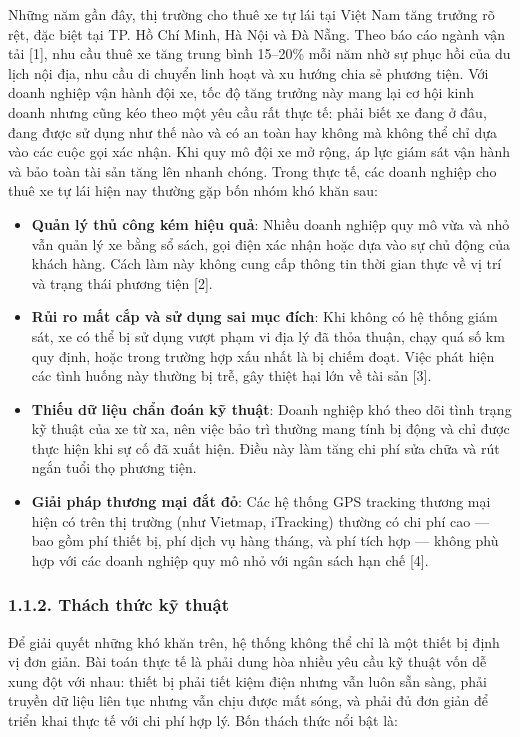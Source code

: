 \documentclass[a4paper]{extarticle}
\providecommand{\tightlist}{%
  \setlength{\itemsep}{0pt}\setlength{\parskip}{0pt}}
\begin{document}
Những năm gần đây, thị trường cho thuê xe tự lái tại Việt Nam tăng
trưởng rõ rệt, đặc biệt tại TP. Hồ Chí Minh, Hà Nội và Đà Nẵng. Theo báo
cáo ngành vận tải {[}1{]}, nhu cầu thuê xe tăng trung bình 15--20\% mỗi
năm nhờ sự phục hồi của du lịch nội địa, nhu cầu di chuyển linh hoạt và
xu hướng chia sẻ phương tiện. Với doanh nghiệp vận hành đội xe, tốc độ
tăng trưởng này mang lại cơ hội kinh doanh nhưng cũng kéo theo một yêu
cầu rất thực tế: phải biết xe đang ở đâu, đang được sử dụng như thế nào
và có an toàn hay không mà không thể chỉ dựa vào các cuộc gọi xác nhận.
Khi quy mô đội xe mở rộng, áp lực giám sát vận hành và bảo toàn tài sản
tăng lên nhanh chóng. Trong thực tế, các doanh nghiệp cho thuê xe tự lái
hiện nay thường gặp bốn nhóm khó khăn sau:

\begin{itemize}
\tightlist
\item
  \textbf{Quản lý thủ công kém hiệu quả}: Nhiều doanh nghiệp quy mô vừa
  và nhỏ vẫn quản lý xe bằng sổ sách, gọi điện xác nhận hoặc dựa vào sự
  chủ động của khách hàng. Cách làm này không cung cấp thông tin thời
  gian thực về vị trí và trạng thái phương tiện {[}2{]}.
\item
  \textbf{Rủi ro mất cắp và sử dụng sai mục đích}: Khi không có hệ thống
  giám sát, xe có thể bị sử dụng vượt phạm vi địa lý đã thỏa thuận, chạy
  quá số km quy định, hoặc trong trường hợp xấu nhất là bị chiếm đoạt.
  Việc phát hiện các tình huống này thường bị trễ, gây thiệt hại lớn về
  tài sản {[}3{]}.
\item
  \textbf{Thiếu dữ liệu chẩn đoán kỹ thuật}: Doanh nghiệp khó theo dõi
  tình trạng kỹ thuật của xe từ xa, nên việc bảo trì thường mang tính bị
  động và chỉ được thực hiện khi sự cố đã xuất hiện. Điều này làm tăng
  chi phí sửa chữa và rút ngắn tuổi thọ phương tiện.
\item
  \textbf{Giải pháp thương mại đắt đỏ}: Các hệ thống GPS tracking thương
  mại hiện có trên thị trường (như Vietmap, iTracking) thường có chi phí
  cao --- bao gồm phí thiết bị, phí dịch vụ hàng tháng, và phí tích hợp
  --- không phù hợp với các doanh nghiệp quy mô nhỏ với ngân sách hạn
  chế {[}4{]}.
\end{itemize}

\subsubsection{1.1.2. Thách thức kỹ
thuật}\label{112-thuxe1ch-thux1ee9c-kux1ef9-thuux1eadt}

Để giải quyết những khó khăn trên, hệ thống không thể chỉ là một thiết
bị định vị đơn giản. Bài toán thực tế là phải dung hòa nhiều yêu cầu kỹ
thuật vốn dễ xung đột với nhau: thiết bị phải tiết kiệm điện nhưng vẫn
luôn sẵn sàng, phải truyền dữ liệu liên tục nhưng vẫn chịu được mất
sóng, và phải đủ đơn giản để triển khai thực tế với chi phí hợp lý. Bốn
thách thức nổi bật là:
\end{document}
